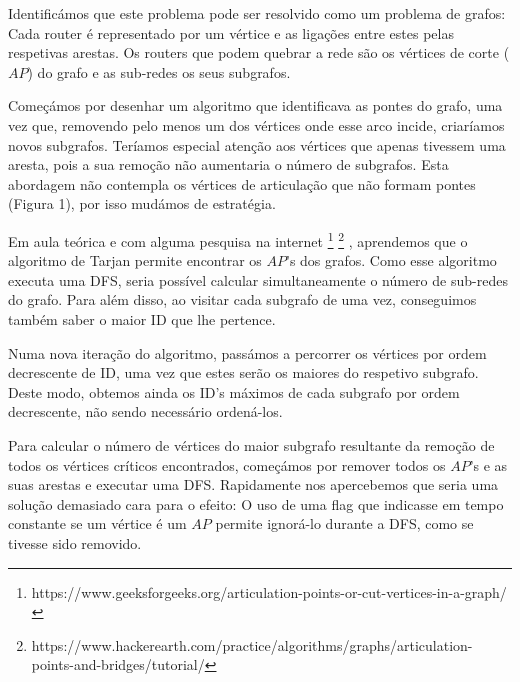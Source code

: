 \documentclass[12pt]{article}
\begin{document}
    \bigskip
    Identificámos que este problema pode ser resolvido como um problema de grafos:
    Cada router é representado por um vértice e as ligações entre estes pelas respetivas 
    arestas. Os routers que podem quebrar a rede são os vértices de corte ($AP$)
    do grafo e as sub-redes os seus subgrafos.
    \par
    Começámos por desenhar um algoritmo que identificava as pontes do grafo, uma vez
    que, removendo pelo menos um dos vértices onde esse arco incide, criaríamos novos 
    subgrafos. Teríamos especial atenção aos vértices que apenas tivessem uma aresta,
    pois a sua remoção não aumentaria o número de subgrafos. Esta abordagem não contempla
    os vértices de articulação que não formam pontes (Figura 1), por isso mudámos de estratégia.
    \par
    Em aula teórica e com alguma pesquisa na internet
    \footnote{https://www.geeksforgeeks.org/articulation-points-or-cut-vertices-in-a-graph/}
    \footnote{https://www.hackerearth.com/practice/algorithms/graphs/articulation-points-and-bridges/tutorial/}
    , aprendemos que o algoritmo de 
    Tarjan permite encontrar os $AP$'s dos grafos. Como esse algoritmo executa uma DFS, 
    seria possível calcular simultaneamente o número de sub-redes do grafo. Para além disso,
    ao visitar cada subgrafo de uma vez, conseguimos também saber o maior ID que lhe pertence.
    \par
    Numa nova iteração do algoritmo, passámos a percorrer os vértices por ordem decrescente de 
    ID, uma vez que estes serão os maiores do respetivo subgrafo. Deste modo, obtemos ainda os 
    ID's máximos de cada subgrafo por ordem decrescente, não sendo necessário ordená-los.
    \par
    Para calcular o número de vértices do maior subgrafo resultante da 
    remoção de todos os vértices críticos encontrados, começámos por  
    remover todos os $AP$'s e as suas arestas e executar uma DFS.
    Rapidamente nos apercebemos que seria uma solução demasiado cara para o efeito: O uso de uma
    flag que indicasse em tempo constante se um vértice é um $AP$ permite ignorá-lo durante a DFS,
    como se tivesse sido removido.
    \par
\end{document}
